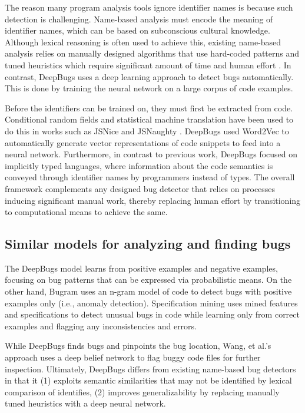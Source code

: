The reason many program analysis tools ignore identifier names is because such detection is challenging. Name-based analysis must encode the meaning of identifier names, which can be based on subconscious cultural knowledge. Although lexical reasoning is often used to achieve this, existing name-based analysis relies on manually designed algorithms that use hard-coded patterns and tuned heuristics which require significant amount of time and human effort \cite{host_debugging_2009, noauthor_nomen_nodate, pradel_deepbugs_2018, noauthor_detecting_nodate}. In contrast, DeepBugs uses a deep learning approach to detect bugs automatically. This is done by training the neural network on a large corpus of code examples.

Before the identifiers can be trained on, they must first be extracted from code. Conditional random fields and statistical machine translation have been used to do this in works such as JSNice \cite{raychev_predicting_2015} and JSNaughty \cite{vasilescu_recovering_2017}. DeepBugs used Word2Vec \cite{mikolov_efficient_2013} to automatically generate vector representations of code snippets to feed into a neural network. Furthermore, in contrast to previous work, DeepBugs focused on implicitly typed languages, where information about the code semantics is conveyed through identifier names by programmers instead of types. The overall framework complements any designed bug detector that relies on processes inducing significant manual work, thereby replacing human effort by transitioning to computational means to achieve the same. 

\subsection{Similar models for analyzing and finding bugs}
\label{subsec:Models for Analyzing and Finding Bugs}

The DeepBugs model learns from positive examples and negative examples, focusing on bug patterns that can be expressed via probabilistic means. On the other hand, Bugram \cite{wang_bugram_2016} uses an n-gram model of code to detect bugs with positive examples only (i.e., anomaly detection). Specification mining \cite{ammons_mining_2002} uses mined features and specifications to detect unusual bugs in code \cite{liang_antminer_2016,pradel_deepbugs_2018,wasylkowski_mining_2011} while learning only from correct examples and flagging any inconsistencies and errors. 

While DeepBugs finds bugs and pinpoints the bug location, Wang, et al.'s approach uses a deep belief network \cite{wang_automatically_2016}  to flag buggy code files for further inspection. Ultimately, DeepBugs differs from existing name-based bug detectors in that it (1) exploits semantic similarities that may not be identified by lexical comparison of identifies, (2) improves generalizability by replacing manually tuned heuristics with a deep neural network.

